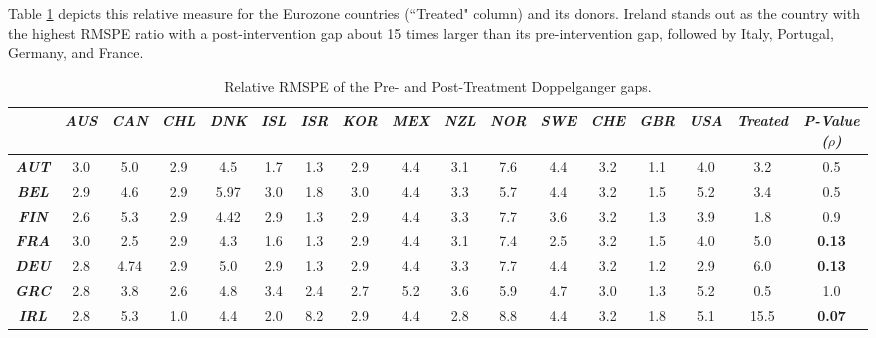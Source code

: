 \documentclass[12pt]{article}
\newcommand{\annote}[1]{\parbox{\textwidth}{\renewcommand{\baselinestretch}{1.0}\vspace{12pt} \small Notes: #1}}
\begin{document}
Table \ref{TA_RMSPE} depicts this relative measure for the Eurozone countries (``Treated" column) and its donors. Ireland stands out as the country with the highest RMSPE ratio with a post-intervention gap about 15 times larger than its pre-intervention gap, followed by Italy, Portugal, Germany, and France. 


\begin{table}[htbp!]
\scriptsize
\caption{\label{TA_RMSPE} Relative RMSPE of the Pre- and Post-Treatment Doppelganger gaps.}\centering\medskip
\begin{tabular}{c|cccccccccccccc|c||c} \toprule
                      & \textit{\textbf{AUS}} & \textit{\textbf{CAN}} & \textit{\textbf{CHL}} & \textit{\textbf{DNK}} & \textit{\textbf{ISL}} & \textit{\textbf{ISR}}  & \textit{\textbf{KOR}} & \textit{\textbf{MEX}} & \textit{\textbf{NZL}} & \textit{\textbf{NOR}} & \textit{\textbf{SWE}} & \textit{\textbf{CHE}} & \textit{\textbf{GBR}} & \textit{\textbf{USA}} & \textit{\textbf{Treated}} & \textit{\textbf{P-Value ($\rho$)}} \\ \midrule
\textit{\textbf{AUT}} & 3.0 & 5.0 & 2.9 & 4.5 & 1.7 & 1.3 & 2.9 & 4.4 & 3.1 & 7.6 & 4.4 & 3.2 & 1.1 & 4.0 & 3.2  & 0.5  \\
\textit{\textbf{BEL}} & 2.9 & 4.6 & 2.9 & 5.97 & 3.0 & 1.8 & 3.0 & 4.4 & 3.3 & 5.7 & 4.4 & 3.2 & 1.5 & 5.2 & 3.4  & 0.5 \\
\textit{\textbf{FIN}} & 2.6 & 5.3 & 2.9 & 4.42 & 2.9 & 1.3 & 2.9 & 4.4 & 3.3 & 7.7 & 3.6 & 3.2 & 1.3 & 3.9 & 1.8  & 0.9 \\
\textit{\textbf{FRA}} & 3.0 & 2.5 & 2.9 & 4.3 & 1.6 & 1.3 & 2.9 & 4.4 & 3.1 & 7.4 & 2.5 & 3.2 & 1.5 & 4.0 & 5.0  & \textbf{0.13} \\
\textit{\textbf{DEU}} & 2.8 & 4.74 & 2.9 & 5.0 & 2.9 & 1.3 & 2.9 & 4.4 & 3.3 & 7.7 & 4.4 & 3.2 & 1.2 & 2.9 & 6.0  & \textbf{0.13} \\
\textit{\textbf{GRC}} & 2.8 & 3.8 & 2.6 & 4.8 & 3.4 & 2.4 & 2.7 & 5.2 & 3.6 & 5.9 & 4.7 & 3.0 & 1.3 & 5.2 & 0.5  & 1.0\\
\textit{\textbf{IRL}} & 2.8 & 5.3 & 1.0 & 4.4 & 2.0 & 8.2 & 2.9 & 4.4 & 2.8 & 8.8 & 4.4 & 3.2 & 1.8 & 5.1 & 15.5 & \textbf{0.07} \\

\end{tabular}
\end{table}
\end{document}
